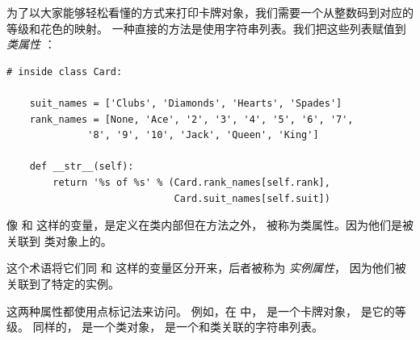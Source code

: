 \label{class.attribute}
  


为了以大家能够轻松看懂的方式来打印卡牌对象，我们需要一个从整数码到对应的等级和花色的映射。
一种直接的方法是使用字符串列表。我们把这些列表赋值到 {\em 类属性} ：

\begin{lstlisting}
# inside class Card:

    suit_names = ['Clubs', 'Diamonds', 'Hearts', 'Spades']
    rank_names = [None, 'Ace', '2', '3', '4', '5', '6', '7',
              '8', '9', '10', 'Jack', 'Queen', 'King']

    def __str__(self):
        return '%s of %s' % (Card.rank_names[self.rank],
                             Card.suit_names[self.suit])
\end{lstlisting}


像  和  这样的变量，是定义在类内部但在方法之外，
被称为类属性。因为他们是被关联到  类对象上的。

  


这个术语将它们同  和  这样的变量区分开来，后者被称为 {\em 实例属性}，
因为他们被关联到了特定的实例。


这两种属性都使用点标记法来访问。  
例如，在  中，  是一个卡牌对象，  是它的等级。
同样的，  是一个类对象，  是一个和类关联的字符串列表。

